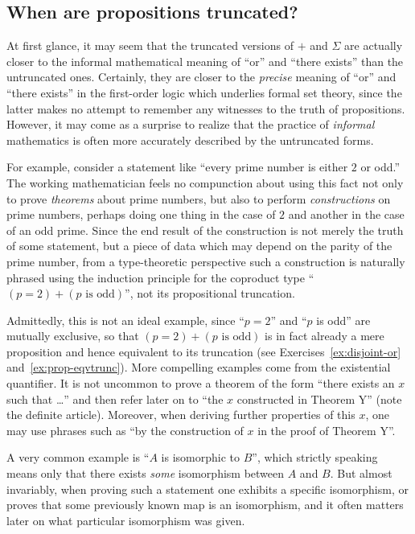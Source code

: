 \subsection{When are propositions truncated?}
\label{subsec:when-trunc}

At first glance, it may seem that the truncated versions of $+$ and $\Sigma$ are actually closer to the informal mathematical meaning of ``or'' and ``there exists'' than the untruncated ones.
Certainly, they are closer to the \emph{precise} meaning of ``or'' and ``there exists'' in the first-order logic which underlies formal set theory, since the latter makes no attempt to remember any witnesses to the truth of propositions.
However, it may come as a surprise to realize that the practice of \emph{informal} mathematics is often more accurately described by the untruncated forms.

For example, consider a statement like ``every prime number is either $2$ or odd.''
The working mathematician feels no compunction about using this fact not only to prove \emph{theorems} about prime numbers, but also to perform \emph{constructions} on prime numbers, perhaps doing one thing in the case of $2$ and another in the case of an odd prime.
Since the end result of the construction is not merely the truth of some statement, but a piece of data which may depend on the parity of the prime number, from a type-theoretic perspective such a construction is naturally phrased using the induction principle for the coproduct type ``$(p=2)+(p\text{ is odd})$'', not its propositional truncation.

Admittedly, this is not an ideal example, since ``$p=2$'' and ``$p$ is odd'' are mutually exclusive, so that $(p=2)+(p\text{ is odd})$ is in fact already a mere proposition and hence equivalent to its truncation (see Exercises~\ref{ex:disjoint-or} and~\ref{ex:prop-eqvtrunc}).
More compelling examples come from the existential quantifier.
It is not uncommon to prove a theorem of the form ``there exists an $x$ such that \dots'' and then refer later on to ``the $x$ constructed in Theorem Y'' (note the definite article).
Moreover, when deriving further properties of this $x$, one may use phrases such as ``by the construction of $x$ in the proof of Theorem Y''.

A very common example is ``$A$ is isomorphic to $B$'', which strictly speaking means only that there exists \emph{some} isomorphism between $A$ and $B$.
But almost invariably, when proving such a statement one exhibits a specific isomorphism, or proves that some previously known map is an isomorphism, and it often matters later on what particular isomorphism was given.


